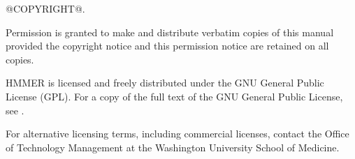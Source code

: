 \vspace*{\fill}
\begin{flushleft}
@COPYRIGHT@.\vspace{5mm}

\vspace{5mm}
Permission is granted to make and distribute verbatim copies of this
manual provided the copyright notice and this permission notice are
retained on all copies.\vspace{5mm}

\vspace{5mm}
HMMER is licensed and freely distributed under the GNU General Public
License (GPL). For a copy of the full text of the GNU General Public
License, see
.

\vspace{5mm}
For alternative licensing terms, including commercial licenses,
contact the Office of Technology Management at the Washington
University School of Medicine.

\vspace{5mm}
\end{flushleft}

